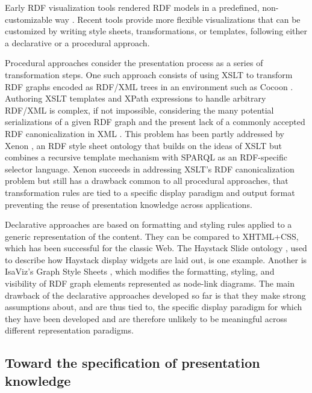 Early RDF visualization tools rendered RDF models in a predefined, non-custo\-mizable way \cite{Steer03}. Recent tools provide more flexible visualizations that can be customized by writing style sheets, transformations, or templates, following either a declarative or a procedural approach.

Procedural approaches consider the presentation process as a series of transformation steps. One such approach consists of using XSLT to transform RDF graphs encoded as RDF/XML trees in an environment such as Cocoon \cite{cocoon05}. Authoring XSLT templates and XPath expressions to handle arbitrary RDF/XML is complex, if not impossible, considering the many potential serializations of a given RDF graph and the present lack of a commonly accepted RDF canonicalization in XML \cite{Carroll04}. This problem has been partly addressed by Xenon \cite{quan05}, an RDF style sheet ontology that builds on the ideas of XSLT but combines a recursive template mechanism with SPARQL as an RDF-specific selector language. Xenon succeeds in addressing XSLT's RDF canonicalization problem but still has a drawback common to all procedural approaches, that transformation rules are tied to a specific display paradigm and output format preventing the reuse of presentation knowledge across applications.

Declarative approaches are based on formatting and styling rules applied to a generic representation of the content. They can be compared to XHTML+CSS, which has been successful for the classic Web. The Haystack Slide ontology \cite{HaystackUI03}, used to describe how Haystack display widgets are laid out, is one example. Another is IsaViz's Graph Style Sheets \cite{gss03}, which modifies the formatting, styling, and visibility of RDF graph elements represented as node-link diagrams. The main drawback of the declarative approaches developed so far is that they make strong assumptions about, and are thus tied to, the specific display paradigm for which they have been developed and are therefore unlikely to be meaningful across different representation paradigms.

\subsection{Toward the specification of presentation knowledge}

